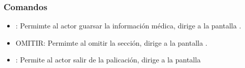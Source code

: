    

\subsubsection{Comandos}
    \begin{itemize}
    	\item {}: Permimte al actor guarsar la información médica, dirige a la pantalla .
        \item OMITIR: Permimte al omitir la sección, dirige a la pantalla .
        \item \btnRegresar[Regresar]: Permite al actor salir de la palicación, dirige a la pantalla 
    \end{itemize}